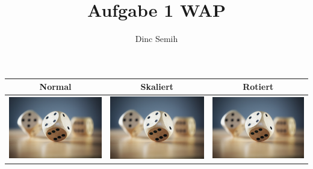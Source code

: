 \documentclass{article}
\title{Aufgabe 1 WAP}
\author{Dinc Semih}
\begin{document}
	\maketitle
	\begin{center}
			\begin{tabular}{c| c |c}
			Normal & Skaliert & Rotiert \\
			\hline
			\includegraphics[scale=0.2]{Bild1} &
			\includegraphics[scale=0.40]{Bild1} &
			\includegraphics[angle= 20, origin = c, scale=0.07]{Bild1} \\

\end{tabular}
\end{center}
\end{document}
